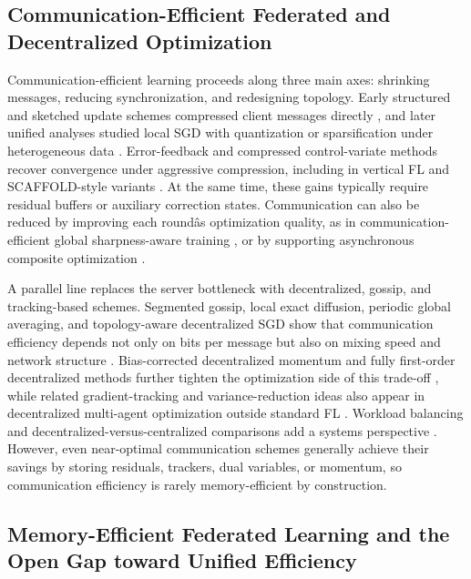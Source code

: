 \documentclass[11pt]{article}
\begin{document}
\subsection{Communication-Efficient Federated and Decentralized Optimization}

Communication-efficient learning proceeds along three main axes: shrinking messages, reducing synchronization, and redesigning topology. Early structured and sketched update schemes compressed client messages directly \citep{konevcny2016federated}, and later unified analyses studied local SGD with quantization or sparsification under heterogeneous data \citep{Haddadpour2020FederatedLW, Condat2024LoCoDLCD}. Error-feedback and compressed control-variate methods recover convergence under aggressive compression, including in vertical FL and SCAFFOLD-style variants \citep{Valdeira2024CommunicationefficientVF, Huang2023StochasticCA}. At the same time, these gains typically require residual buffers or auxiliary correction states. Communication can also be reduced by improving each roundâs optimization quality, as in communication-efficient global sharpness-aware training \citep{caldarola2025beyond}, or by supporting asynchronous composite optimization \citep{Tran-Dinh2021FedDRR}. 

A parallel line replaces the server bottleneck with decentralized, gossip, and tracking-based schemes. Segmented gossip, local exact diffusion, periodic global averaging, and topology-aware decentralized SGD show that communication efficiency depends not only on bits per message but also on mixing speed and network structure \citep{hu2019decentralized, Alghunaim2023LocalEF, chen2021accelerating, Sato2020NetworkDensityControlledDP, zhou2022defta, koloskova2021improved}. Bias-corrected decentralized momentum and fully first-order decentralized methods further tighten the optimization side of this trade-off \citep{Hu2025ABD, Wen2024ACA}, while related gradient-tracking and variance-reduction ideas also appear in decentralized multi-agent optimization outside standard FL \citep{jiang2022mdpgt, Chen2022DecentralizedNP, horvath2023stochastic}. Workload balancing and decentralized-versus-centralized comparisons add a systems perspective \citep{mohammadabadi2024communication, lian2017can}. However, even near-optimal communication schemes generally achieve their savings by storing residuals, trackers, dual variables, or momentum, so communication efficiency is rarely memory-efficient by construction.

\subsection{Memory-Efficient Federated Learning and the Open Gap toward Unified Efficiency}
\end{document}
